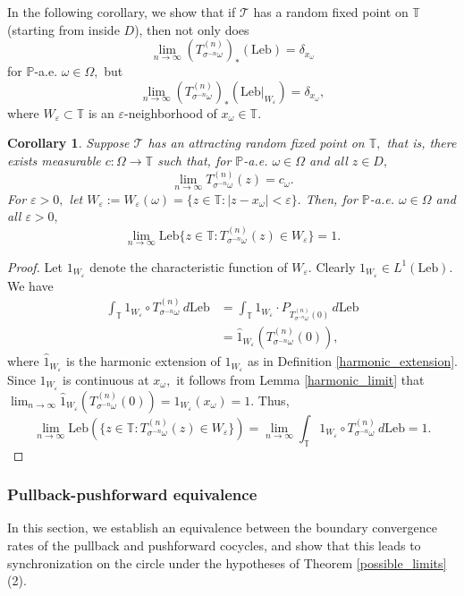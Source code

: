 \documentclass[12pt,reqno]{amsart}
\numberwithin{theorem}{section}
\newtheorem{corollary}[theorem]{Corollary}
\begin{document}
In the following corollary, we show that if $\mathcal{T}$ has a random fixed point on $\mathbb{T}$ (starting from inside $D$), then not only does $$\lim_{n\to\infty}(T_{\sigma^{-n}\omega}^{(n)})_{*}(\text{Leb})=\delta_{x_{\omega}}$$ for $\mathbb{P}$-a.e. $\omega\in\Omega,$ but $$\lim_{n\to\infty}(T_{\sigma^{-n}\omega}^{(n)})_{*}(\text{Leb}|_{W_{\varepsilon}})=\delta_{x_{\omega}},$$ where $W_{\varepsilon}\subset\mathbb{T}$ is an $\varepsilon$-neighborhood of $x_{\omega}\in\mathbb{T}.$
\begin{corollary}\label{neighborhood_convergence_Leb}
    Suppose $\mathcal{T}$ has an attracting random fixed point on $\mathbb{T},$ that is, there exists measurable $c:\Omega\to\mathbb{T}$ such that, for $\mathbb{P}$-a.e. $\omega\in\Omega$ and all $z\in D,$ $$\lim_{n\to\infty}T_{\sigma^{-n}\omega}^{(n)}(z)=c_{\omega}.$$ For $\varepsilon>0,$ let $W_{\varepsilon}:=W_{\varepsilon}(\omega)=\{z\in\mathbb{T}:|z-x_{\omega}|<\varepsilon\}.$ Then, for $\mathbb{P}$-a.e. $\omega\in\Omega$ and all $\varepsilon>0,$ $$\lim_{n\to\infty}\text{Leb}\{z\in\mathbb{T}:T_{\sigma^{-n}\omega}^{(n)}(z)\in W_{\varepsilon}\}=1.$$
\end{corollary}
\begin{proof}
    Let $1_{W_{\varepsilon}}$ denote the characteristic function of $W_{\varepsilon}.$ Clearly $1_{W_{\varepsilon}}\in L^1(\text{Leb}).$ We have \begin{align*}
        \int_{\mathbb{T}}1_{W_{\varepsilon}}\circ T_{\sigma^{-n}\omega}^{(n)}\,d\text{Leb}&=\int_{\mathbb{T}}1_{W_{\varepsilon}}\cdot P_{T_{\sigma^{-n}\omega}^{(n)}(0)}\,d\text{Leb}\\&=\hat{1}_{W_{\varepsilon}}(T_{\sigma^{-n}\omega}^{(n)}(0)),
    \end{align*} where $\hat{1}_{W_{\varepsilon}}$ is the harmonic extension of $1_{W_{\varepsilon}}$ as in Definition \ref{harmonic_extension}. Since $1_{W_{\varepsilon}}$ is continuous at $x_{\omega},$ it follows from Lemma \ref{harmonic_limit} that $\lim_{n\to\infty}\hat{1}_{W_{\varepsilon}}(T_{\sigma^{-n}\omega}^{(n)}(0))=1_{W_{\varepsilon}}(x_{\omega})=1.$ Thus, $$\lim_{n\to\infty}\text{Leb}(\{z\in\mathbb{T}:T_{\sigma^{-n}\omega}^{(n)}(z)\in W_{\varepsilon}\})=\lim_{n\to\infty}\int_{\mathbb{T}}1_{W_{\varepsilon}}\circ T_{\sigma^{-n}\omega}^{(n)}\,d\text{Leb}=1.$$
\end{proof}

\subsubsection{Pullback-pushforward equivalence} In this section, we establish an equivalence between the boundary convergence rates of the pullback and pushforward cocycles, and show that this leads to synchronization on the circle under the hypotheses of Theorem \ref{possible_limits}(2).
\end{document}
